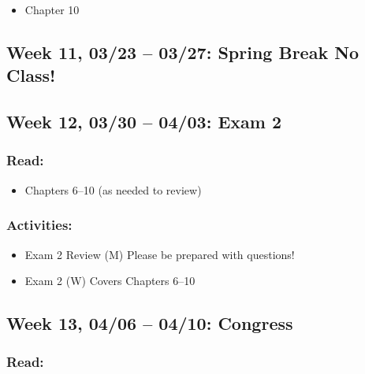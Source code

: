 \documentclass[11pt,]{article}
\providecommand{\tightlist}{%
  \setlength{\itemsep}{0pt}\setlength{\parskip}{0pt}}
\begin{document}
\begin{itemize}
\tightlist
\item
  Chapter 10
\end{itemize}

\hypertarget{week-11-0323-0327-spring-break-no-class}{%
\subsection{Week 11, 03/23 -- 03/27: Spring Break \textbar{} No
Class!}\label{week-11-0323-0327-spring-break-no-class}}

\hypertarget{week-12-0330-0403-exam-2}{%
\subsection{Week 12, 03/30 -- 04/03: Exam
2}\label{week-12-0330-0403-exam-2}}

\hypertarget{read-10}{%
\subsubsection{Read:}\label{read-10}}

\begin{itemize}
\tightlist
\item
  Chapters 6--10 (as needed to review)
\end{itemize}

\hypertarget{activities-1}{%
\subsubsection{Activities:}\label{activities-1}}

\begin{itemize}
\item
  Exam 2 Review (M) \textbar{} Please be prepared with questions!
\item
  Exam 2 (W) \textbar{} Covers Chapters 6--10
\end{itemize}

\hypertarget{week-13-0406-0410-congress}{%
\subsection{Week 13, 04/06 -- 04/10:
Congress}\label{week-13-0406-0410-congress}}

\hypertarget{read-11}{%
\subsubsection{Read:}\label{read-11}}
\end{document}
